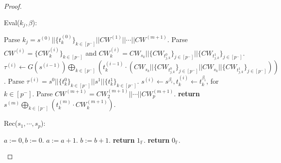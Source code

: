 \documentclass[11pt]{article}
\newcommand{\Eval}{\textsf{Eval}}
\newcommand{\Rec}{\textsf{Rec}}
\begin{document}
\begin{proof}
\begin{algorithm}
\vspace{10px}
\Eval($k_j, \beta$):
\begin{algorithmic}[1]
\State Parse $k_j = s^{(0)}||\{t_k^{(0)}\}_{k \in [p^-]}||CW^{(1)}||\cdots||CW^{(m+1)}$.
\State Parse $CW^{(i)} = \{CW^{(i)}_k\}_{k \in [p^-]}$ and $CW^{(i)}_k = CW_{s_k}||\{CW_{t_{j,k}^0}\}_{j \in [p^-]}||\{CW_{t_{j,k}^1}\}_{j \in [p^-]} $.
\State $\tau^{(i)} \leftarrow G(s^{(i-1)}) \bigoplus_{k \in [p^-]} \left(t^{(i-1)}_k \cdot \left(CW_{s_k}||\{CW_{t_{j,k}^0}\}_{j \in [p^-]}||CW_{s_k}||\{CW_{t_{j,k}^1}\}_{j \in [p^-]}\right)\right)$.
\State Parse $\tau^{(i)} = s^0||\{t_{k}^0\}_{k \in [p^-]} ||s^1||\{t_k^1\}_{k \in [p^-]}$.
\State $s^{(i)} \leftarrow s^{\beta_i}, t_k^{(i)} \leftarrow t_k^{\beta_i}$, for $k \in [p^-]$.
\EndFor
\State Parse $CW^{(m+1)} = CW^{(m+1)}_2 || \cdots || CW^{(m+1)}_p$.
\State \textbf{return} $s^{(m)} \bigoplus_{k \in [p^-]} \left(t_k^{(m)} \cdot CW^{(m+1)}_k \right)$.
\end{algorithmic}

\vspace{10px}
\Rec($s_1, \cdots, s_p$):
\begin{algorithmic}[1]
\State $a := 0, b := 0$.
\State $a := a + 1$.
\Else
\State $b := b + 1$.
\EndIf
\EndFor
{}
\State \textbf{return} $1_\mathbb{F}$.
\Else
\State \textbf{return} $0_\mathbb{F}$.
\EndIf
\end{algorithmic}
\end{algorithm}



\end{proof}
\end{document}
